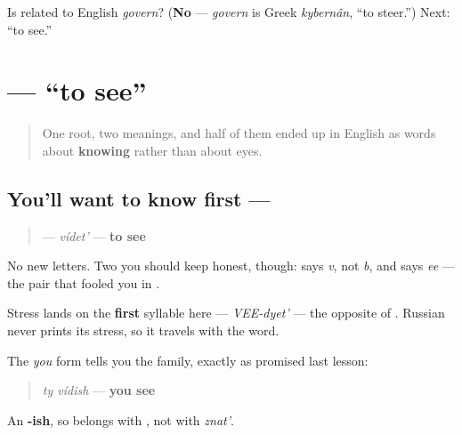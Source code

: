 \begin{tcolorbox}[breakable,colback=teal!4,colframe=teal!35!black,title={Before you move on}]
Is \emph{} related to English \emph{govern}? (\textbf{No} — \emph{govern} is Greek \emph{kybernân}, \textquotedblleft{}to steer.\textquotedblright{}) Next: \textquotedblleft{}to see.\textquotedblright{}
\end{tcolorbox}
\section[\texorpdfstring{\ru{видеть} (vídet')}{видеть (vídet')}]{ — \textquotedblleft{}to see\textquotedblright{}}

\label{lesson:RU-C03-videt}



\begin{quote}
One root, two meanings, and half of them ended up in English as words about \textbf{knowing} rather than about eyes.
\end{quote}

\subsection*{You'll want to know first — }
\begin{quote}
\textbf{} — \emph{vídet'} — \textbf{to see}
\end{quote}

No new letters. Two you should keep honest, though: \textbf{} says \emph{v}, not \emph{b}, and \textbf{} says \emph{ee} — the pair that fooled you in \emph{}.

Stress lands on the \textbf{first} syllable here — \emph{VEE-dyet'} — the opposite of \emph{}. Russian never prints its stress, so it travels with the word.

The \emph{you} form tells you the family, exactly as promised last lesson:

\begin{quote}
\emph{ty vídish} — \textbf{you see}
\end{quote}

An \textbf{-ish}, so \emph{} belongs with \emph{}, not with \emph{znat'}.

